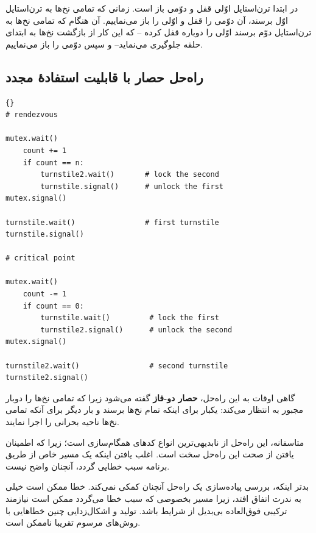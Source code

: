 \documentclass{book}
\newcommand{\clearemptydoublepage}{\newpage\cleardoublepage}
\begin{document}
    در ابتدا ترن‌استایل اوّلی قفل و دوّمی باز است. زمانی که تمامی نخ‌ها به ترن‌استایل اوّل برسند، آن دوّمی را قفل  و اوّلی را باز می‌نماییم. 
    آن هنگام که تمامی نخ‌ها به ترن‌استایل دوّم برسند اوّلی را دوباره قفل کرده --%
    که این کار از بازگشت نخ‌ها به ابتدای حلقه جلوگیری می‌نماید--
    و سپس دوّمی را باز می‌نماییم.


\clearemptydoublepage
\subsection {   راه‌حل حصار با قابلیت استفادهٔ مجدد}


\begin{latin}
\begin{lstlisting}[title=\rl{ راهنمای حصار با قابلیت استفادهٔ مجدد}]{} 
# rendezvous

mutex.wait()
    count += 1
    if count == n:
        turnstile2.wait()       # lock the second
        turnstile.signal()      # unlock the first
mutex.signal()

turnstile.wait()                # first turnstile
turnstile.signal()

# critical point

mutex.wait()
    count -= 1
    if count == 0: 
        turnstile.wait()         # lock the first
        turnstile2.signal()      # unlock the second
mutex.signal()

turnstile2.wait()                # second turnstile
turnstile2.signal()
\end{lstlisting}
\end{latin}

    گاهی اوقات به این راه‌حل، \textbf{حصار دو-فاز} گفته می‌شود زیرا که تمامی نخ‌ها را دوبار مجبور به انتظار می‌کند: یکبار برای اینکه تمام نخ‌ها برسند و 
    بار دیگر برای آنکه تمامی نخ‌ها ناحیه بحرانی را اجرا نمایند. 

    متاسفانه، این راه‌حل  از نابدیهی‌ترین انواع کدهای همگام‌سازی است؛ زیرا که اطمینان یافتن از صحت این راه‌حل سخت است. 
    اغلب یافتن اینکه یک مسیر خاص از طریق برنامه سبب خطایی گردد، آنچنان واضح نیست.

    بدتر اینکه، بررسی پیاده‌سازی یک راه‌حل آنچنان کمکی نمی‌کند. خطا ممکن است خیلی به ندرت اتفاق افتد، 
    زیرا مسیر بخصوصی که سبب خطا می‌گردد ممکن است نیازمند ترکیبی فوق‌العاده بی‌بدیل از شرایط باشد. 
    تولید و اشکال‌زدایی چنین خطاهایی با روش‌های مرسوم تقریبا ناممکن است. 
    
\end{document}
